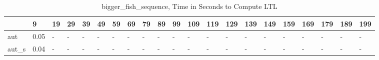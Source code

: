 \begin{table}
\caption{bigger_fish_sequence, Time in Seconds to Compute LTL}
\label{bigger_fish_sequence_LTL_time}
\begin{tabular}{lllllllllllllllllllll}
\toprule
 & 9 & 19 & 29 & 39 & 49 & 59 & 69 & 79 & 89 & 99 & 109 & 119 & 129 & 139 & 149 & 159 & 169 & 179 & 189 & 199 \\
\midrule
aut & 0.05 & - & - & - & - & - & - & - & - & - & - & - & - & - & - & - & - & - & - & - \\
aut_s & 0.04 & - & - & - & - & - & - & - & - & - & - & - & - & - & - & - & - & - & - & - \\
\bottomrule
\end{tabular}
\end{table}
